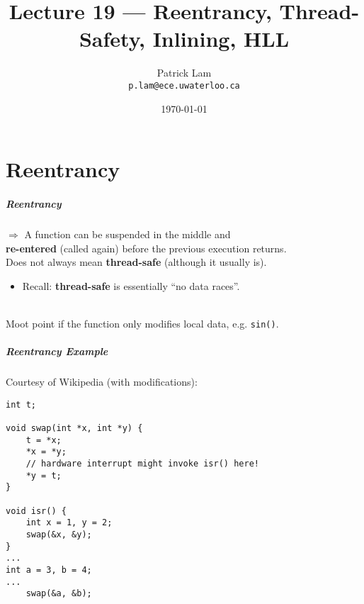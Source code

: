 

\title{Lecture 19 --- Reentrancy, Thread-Safety, Inlining, HLL }

\author{Patrick Lam \\ \small \texttt{p.lam@ece.uwaterloo.ca}}
\date{\today}




\begin{frame}
  \titlepage

 \end{frame}


\part{Reentrancy}
\frame{\partpage}

\begin{frame}
  \frametitle{Reentrancy}

  
    $\Rightarrow$ A function can be suspended in the middle and \\ {\bf re-entered}
      (called again) before the previous execution returns.\\[1em]
    
     Does not always mean {\bf thread-safe} (although it usually is).
      \begin{itemize}
        \item Recall: {\bf thread-safe} is essentially ``no data races''.
      \end{itemize}
 ~\\[1em]
  Moot point if the function only modifies local data, e.g. {\tt sin()}.
  
\end{frame}

\begin{frame}[fragile]
  \frametitle{Reentrancy Example}

  

  Courtesy of Wikipedia (with modifications):
  \begin{lstlisting}
int t;
 
void swap(int *x, int *y) {
    t = *x;
    *x = *y;
    // hardware interrupt might invoke isr() here!
    *y = t;
}
 
void isr() {
    int x = 1, y = 2;
    swap(&x, &y);
}
...
int a = 3, b = 4;
...
    swap(&a, &b);
  \end{lstlisting}
  
\end{frame}


